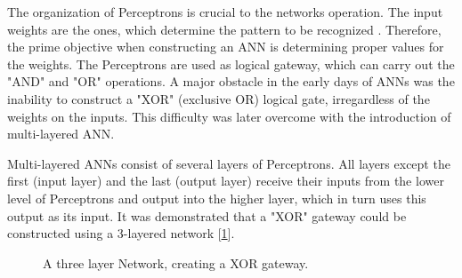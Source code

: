 	The organization of Perceptrons is crucial to the networks operation. The input weights are the ones, which determine the pattern to be recognized \cite{bishop1995neural}. Therefore, the prime objective when constructing an ANN is determining proper values for the weights. The Perceptrons are used as logical gateway, which can carry out the "AND" and "OR" operations. A major obstacle in the early days of ANNs was the inability to construct  a "XOR" (exclusive OR) logical gate, irregardless of the weights on the inputs. This difficulty was later overcome with the introduction of multi-layered ANN.
	
	Multi-layered ANNs consist of several layers of Perceptrons. All layers except the first (input layer) and the last (output layer) receive their inputs from the lower level of Perceptrons and output into the higher layer, which in turn uses this output as its input. It was demonstrated that a "XOR" gateway could be constructed using a 3-layered network [\ref{ANN_XOR}].
	
	\begin{figure}[h]
		\captionsetup{width=0.8\textwidth}
		\caption[ANN XOR Perceptron-Network]{
			\footnotesize{
				A three layer Network, creating a XOR gateway.
			}
		} 
		\label{ANN_XOR}
	\end{figure}	
	
	
